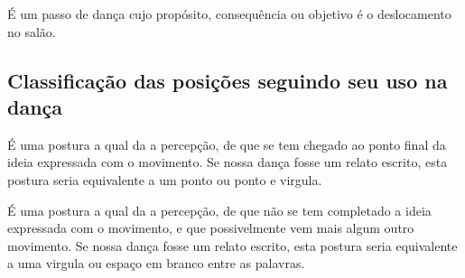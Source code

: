 \begin{definition} 
\label{def:PassoDeDeslocamento}
É um passo de dança cujo propósito, consequência ou objetivo é o deslocamento no salão.
\end{definition}

\subsection{Classificação das posições seguindo seu uso na dança}

\begin{definition} 
\label{def:PosturaFinaliza}
É uma postura a qual da a percepção, 
de que se tem chegado ao ponto final da ideia expressada com o movimento.
Se nossa dança fosse um relato escrito, esta postura seria equivalente a um ponto ou ponto e virgula.
\end{definition}

\begin{definition} 
\label{def:PosturaTransicao}
É uma postura a qual da a percepção, 
de que não se tem completado a ideia expressada com o movimento, e que possivelmente vem mais algum outro movimento.
Se nossa dança fosse um relato escrito, esta postura seria equivalente a uma virgula ou espaço em branco entre as palavras.
\end{definition}

